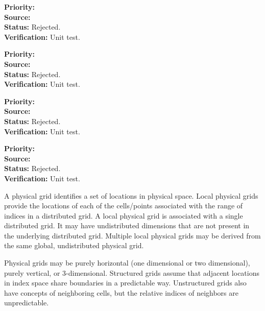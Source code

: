 \begin{reqlist}
{\bf Priority:}  \\
{\bf Source:} \\
{\bf Status:} Rejected. \\
{\bf Verification:} Unit test.
\end{reqlist}

\begin{reqlist}
{\bf Priority:}  \\
{\bf Source:} \\
{\bf Status:} Rejected. \\
{\bf Verification:} Unit test. 
\end{reqlist}

\begin{reqlist}
{\bf Priority:}  \\
{\bf Source:} \\
{\bf Status:} Rejected. \\
{\bf Verification:} Unit test.
\end{reqlist}

\begin{reqlist}
{\bf Priority:}  \\
{\bf Source:} \\
{\bf Status:} Rejected. \\
{\bf Verification:} Unit test. 
\end{reqlist}


A physical grid identifies a set of locations in physical space.  
Local physical grids provide the locations of each of the cells/points
associated with the range of indices in a distributed grid.  A local physical grid is
associated with a single distributed grid.  It may have undistributed dimensions that 
are not present in the underlying distributed grid. Multiple local 
physical grids may be derived from the same global, undistributed physical grid. 

Physical grids may be purely horizontal (one dimensional or two dimensional), purely vertical, or 3-dimensional. 
Structured grids assume that adjacent locations in index space share boundaries
in a predictable way.  Unstructured grids also have concepts of neighboring
cells, but the relative indices of neighbors are unpredictable.

